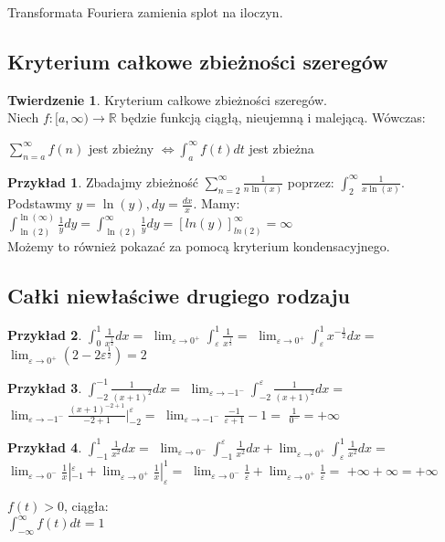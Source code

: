 \documentclass{article}
\theoremstyle{definition}
\theoremstyle{definition}
\newtheorem{tw}{Twierdzenie}[subsection]
\theoremstyle{definition}
\newtheorem{pk}{Przykład}[subsection]
\theoremstyle{definition}
\begin{document}
Transformata Fouriera zamienia splot na iloczyn.

\subsection{Kryterium całkowe zbieżności szeregów}

\begin{tw}
    Kryterium całkowe zbieżności szeregów.\\
    Niech $f: [a,\infty)\rightarrow \mathbb{R}$ będzie funkcją ciągłą, nieujemną i malejącą. Wówczas:
    \begin{center}
        $\sum_{n=a}^{\infty} f(n)$ jest zbieżny $\iff \int_{a}^{\infty} f(t) dt$ jest zbieżna
    \end{center}
\end{tw}

\begin{pk}
    Zbadajmy zbieżność $\sum_{n=2}^{\infty} \frac{1}{n \ln(x)}$ poprzez:
    $\int_{2}^{\infty} \frac{1}{x \ln(x)}$. Podstawmy $y=\ln(y), dy=\frac{dx}{x}$. Mamy:
    $\int_{\ln(2)}^{\ln(\infty)} \frac{1}{y} dy = \int_{\ln(2)}^{\infty} \frac{1}{y} dy = \left[ln(y)\right]_{ln(2)}^{\infty} =\infty$\\
    Możemy to również pokazać za pomocą kryterium kondensacyjnego.
\end{pk}

\subsection{Całki niewłaściwe drugiego rodzaju}

\begin{pk}
$\int_{0}^{1} \frac{1}{x^{\frac{1}{2}}} dx =$
$\lim_{\varepsilon\rightarrow 0^+} \int_{\varepsilon}^{1} \frac{1}{x^{\frac{1}{2}}}=$
$\lim_{\varepsilon\rightarrow 0^+} \int_{\varepsilon}^{1} x^{-\frac{1}{2}} dx =$
$\lim_{\varepsilon\rightarrow 0^+} (2-2\varepsilon^{\frac{1}{2}})=2$
\end{pk}

\begin{pk}
$\int_{-2}^{-1} \frac{1}{(x+1)^2} dx =$
$\lim_{\varepsilon\rightarrow -1^-} \int_{-2}^{\varepsilon} \frac{1}{(x+1)^2} dx =$
$\lim_{\varepsilon\rightarrow -1^-} \frac{(x+1)^{-2+1}}{-2+1} |_{-2}^{\varepsilon}=$
$\lim_{\varepsilon\rightarrow -1^-} \frac{-1}{\varepsilon+1}-1=$
$\frac{1}{0^-} = +\infty$
\end{pk}

\begin{pk}
    $\int_{-1}^{1} \frac{1}{x^2} dx =$
    $\lim_{\varepsilon\rightarrow 0^-} \int_{-1}^{\varepsilon} \frac{1}{x^2} dx + \lim_{\varepsilon\rightarrow 0^+} \int_{\varepsilon}^{1} \frac{1}{x^2} dx =$
    $\lim_{\varepsilon\rightarrow 0^-} \frac{1}{x} |_{-1}^{\varepsilon} + \lim_{\varepsilon\rightarrow 0^+} \frac{1}{x} |_{\varepsilon}^{1} =$
    $\lim_{\varepsilon\rightarrow 0^-} \frac{1}{\varepsilon} + \lim_{\varepsilon\rightarrow 0^+} \frac{1}{\varepsilon} =$
    $+\infty + \infty = +\infty$
\end{pk}
$f(t)>0$, ciągła:\\
$\int_{-\infty}^{\infty} f(t)dt = 1$
\end{document}
